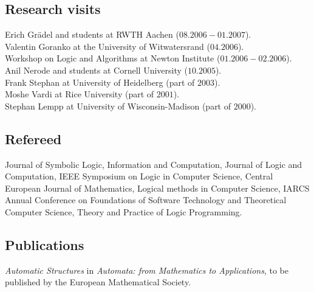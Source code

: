 \documentclass[a4paper]{article}
\begin{document}



\subsection*{Research visits} Erich Gr\"adel and students at RWTH Aachen ($08.2006-01.2007$).\\

Valentin Goranko at the University of Witwatersrand ($04.2006$).\\

Workshop on Logic and Algorithms at Newton Institute ($01.2006 - 02.2006$).\\

Anil Nerode and students at Cornell University ($10.2005$).\\

Frank Stephan at University of Heidelberg (part of $2003$).\\

Moshe Vardi at Rice University (part of $2001$).\\

Stephan Lempp at University of Wisconsin-Madison (part of $2000$).

\subsection*{Refereed}
{Journal of Symbolic Logic}, {Information and Computation}, {Journal of Logic and Computation}, {IEEE Symposium on Logic in Computer Science}, {Central European Journal of Mathematics}, {Logical methods in Computer Science}, {IARCS Annual Conference on
Foundations of Software Technology and Theoretical Computer Science}, {Theory and Practice of Logic Programming}.

\subsection*{Publications}
{\it Automatic Structures} in {\it Automata: from Mathematics to Applications}, to be published by the European Mathematical Society.\\
\end{document}
